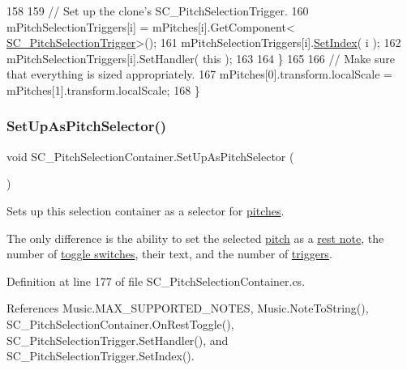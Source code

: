 \begin{DoxyCode}
158 
159             \textcolor{comment}{// Set up the clone's SC\_PitchSelectionTrigger.}
160             mPitchSelectionTriggers[i] = mPitches[i].GetComponent<
      \hyperlink{class_s_c___pitch_selection_trigger}{SC\_PitchSelectionTrigger}>();
161             mPitchSelectionTriggers[i].\hyperlink{group___s_c___p_s_t_pub_func_ga0b4edbf9719a384aa5cf8d29d1065696}{SetIndex}( i );
162             mPitchSelectionTriggers[i].SetHandler( \textcolor{keyword}{this} );
163 
164         \}
165 
166         \textcolor{comment}{// Make sure that everything is sized appropriately.}
167         mPitches[0].transform.localScale = mPitches[1].transform.localScale;
168     \}
\end{DoxyCode}
\mbox{\label{group___s_c___p_s_c_pub_func_gaf6e9338cfe7202df9787304e49afa24d}} 
\subsubsection{\texorpdfstring{Set\+Up\+As\+Pitch\+Selector()}{SetUpAsPitchSelector()}}
{\footnotesize\ttfamily void S\+C\+\_\+\+Pitch\+Selection\+Container.\+Set\+Up\+As\+Pitch\+Selector (\begin{DoxyParamCaption}{ }\end{DoxyParamCaption})}



Sets up this selection container as a selector for \hyperlink{group___music_enums_ga508f69b199ea518f935486c990edac1d}{pitches}. 

The only difference is the ability to set the selected \hyperlink{group___music_enums_ga508f69b199ea518f935486c990edac1d}{pitch} as a \hyperlink{group___doc_s_c___p_s_c_DocSC_PSCRest}{rest note}, the number of \hyperlink{group___s_c___p_s_c_priv_var_ga25180add92621da773b024083d3a61af}{toggle switches}, their text, and the number of \hyperlink{group___s_c___p_s_c_priv_var_ga8431846d376b98bc6de5a872cce2c596}{triggers}. 

Definition at line 177 of file S\+C\+\_\+\+Pitch\+Selection\+Container.\+cs.



References Music.\+M\+A\+X\+\_\+\+S\+U\+P\+P\+O\+R\+T\+E\+D\+\_\+\+N\+O\+T\+ES, Music.\+Note\+To\+String(), S\+C\+\_\+\+Pitch\+Selection\+Container.\+On\+Rest\+Toggle(), S\+C\+\_\+\+Pitch\+Selection\+Trigger.\+Set\+Handler(), and S\+C\+\_\+\+Pitch\+Selection\+Trigger.\+Set\+Index().


